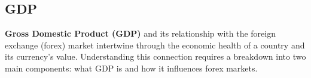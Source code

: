 \documentclass{report}
\begin{document}
     

     
     \bigbreak \noindent 
     \subsection{GDP}
     \bigbreak \noindent 
     \begin{concept}
         \textbf{Gross Domestic Product (GDP)} and its relationship with the foreign exchange (forex) market intertwine through the economic health of a country and its currency's value. Understanding this connection requires a breakdown into two main components: what GDP is and how it influences forex markets.
     \end{concept}
     \bigbreak \noindent 
\end{document}
